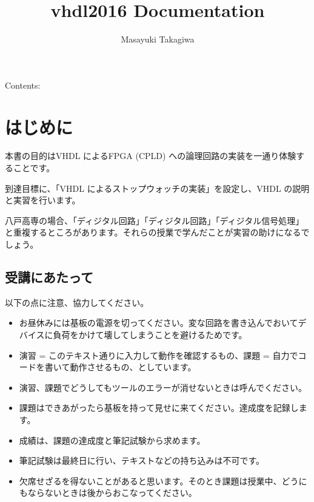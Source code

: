\documentclass[letterpaper,10pt,dvipdfmx]{sphinxmanual}
\title{vhdl2016 Documentation}
\date{}
\author{Masayuki Takagiwa}
\begin{document}
\maketitle
\tableofcontents
{}\label{index::doc}


Contents:


\chapter{はじめに}
\label{01_introduction::doc}\label{01_introduction:id1}
本書の目的はVHDL によるFPGA (CPLD) への論理回路の実装を一通り体験することです。

到達目標に、「VHDL によるストップウォッチの実装」を設定し、VHDL の説明と実習を行います。

八戸高専の場合、「ディジタル回路」「ディジタル回路」「ディジタル信号処理」と重複するところがあります。それらの授業で学んだことが実習の助けになるでしょう。


\section{受講にあたって}
\label{01_introduction:id2}
以下の点に注意、協力してください。
\begin{itemize}
\item {} 
お昼休みには基板の電源を切ってください。変な回路を書き込んでおいてデバイスに負荷をかけて壊してしまうことを避けるためです。

\item {} 
演習 = このテキスト通りに入力して動作を確認するもの、課題 = 自力でコードを書いて動作させるもの、としています。

\item {} 
演習、課題でどうしてもツールのエラーが消せないときは呼んでください。

\item {} 
課題はできあがったら基板を持って見せに来てください。達成度を記録します。

\item {} 
成績は、課題の達成度と筆記試験から求めます。

\item {} 
筆記試験は最終日に行い、テキストなどの持ち込みは不可です。

\item {} 
欠席せざるを得ないことがあると思います。そのとき課題は授業中、どうにもならないときは後からおこなってください。

\end{itemize}
\end{document}
